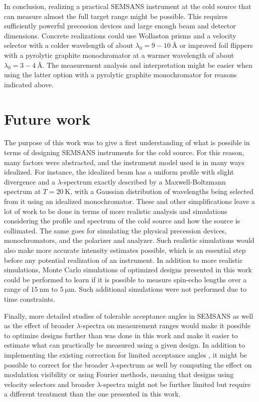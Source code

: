 In conclusion, realizing a practical SEMSANS instrument at the cold source that can measure almost the full target range might be possible. This requires sufficiently powerful precession devices and large enough beam and detector dimensions. Concrete realizations could use Wollaston prisms and a velocity selector with a colder wavelength of about $\lambda_0 = 9 - 10~\unit{\angstrom}$ or improved foil flippers with a pyrolytic graphite monochromator at a warmer wavelength of about $\lambda_0 = 3 - 4~\unit{\angstrom}$. The measurement analysis and interpretation might be easier when using the latter option with a pyrolytic graphite monochromator for reasons indicated above.

\section{Future work}
The purpose of this work was to give a first understanding of what is possible in terms of designing SEMSANS instruments for the cold source. For this reason, many factors were abstracted, and the instrument model used is in many ways idealized. For instance, the idealized beam has a uniform profile with slight divergence and a $\lambda$-spectrum exactly described by a Maxwell-Boltzmann spectrum at $T= \SI{20}{\kelvin}$, with a Gaussian distribution of wavelengths being selected from it using an idealized monochromator. These and other simplifications leave a lot of work to be done in terms of more realistic analysis and simulations considering the profile and spectrum of the cold source and how the source is collimated. The same goes for simulating the physical precession devices, monochromators, and the polarizer and analyzer. Such realistic simulations would also make more accurate intensity estimates possible, which is an essential step before any potential realization of an instrument. In addition to more realistic simulations, Monte Carlo simulations of optimized designs presented in this work could be performed to learn if it is possible to measure spin-echo lengths over a range of $\SI{15}{\nano\meter}$ to $\SI{5}{\micro\meter}$. Such additional simulations were not performed due to time constraints.

Finally, more detailed studies of tolerable acceptance angles in SEMSANS as well as the effect of broader $\lambda$-spectra on measurement ranges would make it possible to optimize designs further than was done in this work and make it easier to estimate what can practically be measured using a given design. In addition to implementing the existing correction for limited acceptance angles \cite{kusmin2017}, it might be possible to correct for the broader $\lambda$-spectrum as well by computing the effect on modulation visibility or using Fourier methods, meaning that designs using velocity selectors and broader $\lambda$-spectra might not be further limited but require a different treatment than the one presented in this work.

